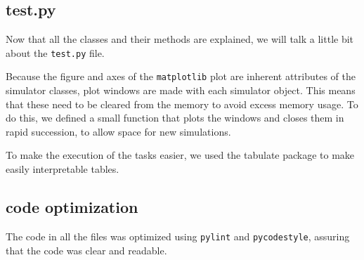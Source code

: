 \subsection{test.py}
Now that all the classes and their methods are explained, we will talk a little bit about the \lstinline[language=PythonPlus, style=colorEX]|test.py| file.

Because the figure and axes of the \lstinline[language=PythonPlus, style=colorEX]|matplotlib| plot are inherent attributes of the simulator classes, plot windows are made with each simulator object. This means that these need to be cleared from the memory to avoid excess memory usage. To do this, we defined a small function that plots the windows and closes them in rapid succession, to allow space for new simulations.

To make the execution of the tasks easier, we used the tabulate package to make easily interpretable tables.

\subsection{code optimization}
The code in all the files was optimized using \lstinline[language=PythonPlus, style= colorEX]|pylint| and \lstinline[language=PythonPlus, style=colorEX]|pycodestyle|, assuring that the code was clear and readable.
